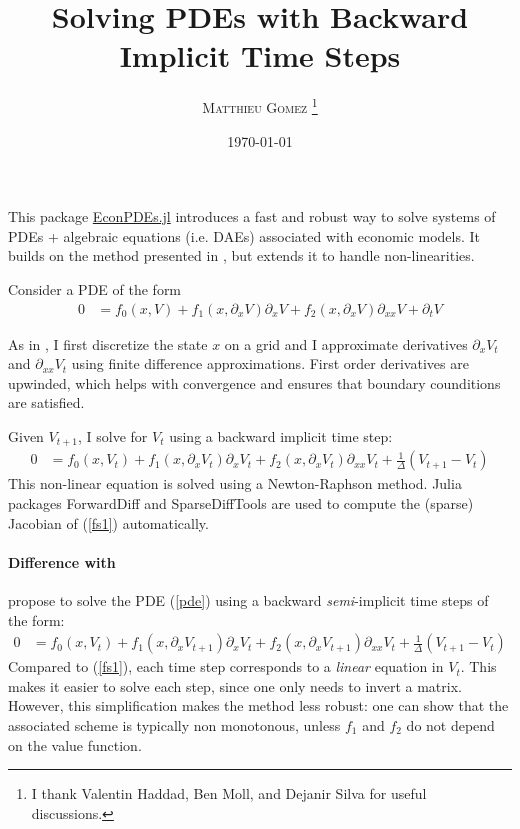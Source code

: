 \documentclass[english]{article}
\begin{document}
	\title{Solving PDEs with Backward Implicit Time Steps}
	\author{\large{\textsc{Matthieu Gomez \thanks{I thank Valentin Haddad, Ben Moll, and Dejanir Silva for useful discussions.}}}}
	\date{\today}
	\maketitle
	This package \href{https://github.com/matthieugomez/EconPDEs.jl}{EconPDEs.jl} introduces a fast and robust way to solve systems of PDEs + algebraic equations (i.e. DAEs) associated with economic models. It builds on the method presented in \citet{achdou2014heterogeneous}, but extends it to handle non-linearities.

	Consider a PDE of the form
	\begin{align}\label{pde}
		0&=f_0(x, V)  + f_1(x, \partial_x V) \partial_x V  + f_2(x, \partial_x V) \partial_{xx} V +  \partial_t V
	\end{align}

	As in \citet{achdou2014heterogeneous}, I first discretize the state $x$ on a grid and I approximate derivatives $\partial_x V_t$ and $\partial_{xx} V_t$ using finite difference approximations. First order derivatives are upwinded, which helps with convergence and ensures that boundary counditions are satisfied.

	Given $V_{t+1}$, I solve for $V_t$ using a backward implicit time step:
	\begin{align}\label{fs1}
		0&=f_0(x, V_t)  + f_1(x, \partial_x V_t) \partial_x V_t  + f_2(x, \partial_x V_t) \partial_{xx} V_t +   \frac{1}{\Delta}(V_{t+1} -V_{t})
	\end{align}
	This non-linear equation is solved using a Newton-Raphson method. 	Julia packages ForwardDiff and SparseDiffTools are used to compute the (sparse) Jacobian of (\ref{fs1}) automatically.



	\paragraph{Difference with \citet{achdou2014heterogeneous}}  \citet{achdou2014heterogeneous} propose to solve the PDE (\ref{pde}) using a backward \emph{semi}-implicit time steps of the form:
	\begin{align}\label{fs2}
		0&=f_0(x, V_t)  + f_1(x, \partial_x V_{t+1}) \partial_x V_t  + f_2(x, \partial_x V_{t+1}) \partial_{xx} V_t +  \frac{1}{\Delta}(V_{t+1} -V_{t})
	\end{align}
	Compared to (\ref{fs1}), each time step corresponds to a \emph{linear} equation in $V_t$. This makes it easier to solve each step, since one only needs to invert a matrix. However, this simplification makes the method less robust: one can show that the associated scheme is typically non monotonous, unless $f_1$ and $f_2$ do not depend on the value function.
\end{document}
